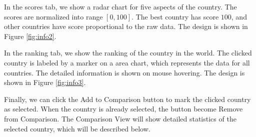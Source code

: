 \documentclass[12pt, fullpage,letterpaper]{article}
\begin{document}
In the scores tab, we show a radar chart for five aspects of the country. The scores are normalized into range $[0,100]$. The best country has score $100$,
and other countries have score proportional to the raw data.
The design is shown in Figure \ref{fig:info2}.

In the ranking tab, we show the ranking of the country in the world. The clicked country is labeled by a marker on a area chart, which represents the data for all countries.
The detailed information is shown on mouse hovering.
The design is shown in Figure \ref{fig:info3}.

Finally, we can click the Add to Comparison button to mark the clicked country as selected.
When the country is already selected, the button become Remove from Comparison.
The Comparison View will show detailed statistics of the selected country, which will be described below.
\end{document}
